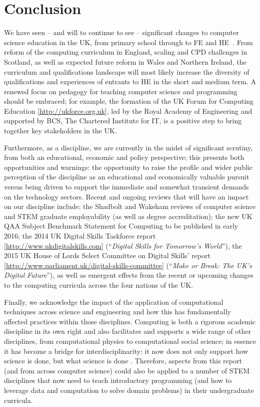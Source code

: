 \documentclass[conference,compsoc]{IEEEtran}
\begin{document}
\section{Conclusion}
 
We have seen -- and will to continue to see -- significant changes to
computer science education in the UK, from primary school through to
FE and HE~\cite{brown-et-al-toce2014}. From reform of the computing
curriculum in England, scaling and CPD challenges in Scotland, as well
as expected future reform in Wales and Northern Ireland, the
curriculum and qualifications landscape will most likely increase the
diversity of qualifications and experiences of entrants to HE in the
short and medium term. A renewed focus on pedagogy for teaching
computer science and programming should be embraced; for example, the
formation of the UK Forum for Computing Education
[\url{http://ukforce.org.uk}], led by the Royal Academy of Engineering
and supported by BCS, The Chartered Institute for IT, is a positive
step to bring together key stakeholders in the UK.
 
Furthermore, as a discipline, we are currently in the midst of
significant scrutiny, from both an educational, economic and policy
perspective; this presents both opportunities and warnings: the
opportunity to raise the profile and wider public perception of the
discipline as an educational and economically valuable pursuit versus
being driven to support the immediate and somewhat transient demands
on the technology sectors. Recent and ongoing reviews that will have
an impact on our discipline include: the Shadbolt and
Wakeham reviews of computer science and STEM graduate employability
(as well as degree accreditation); the new UK QAA Subject Benchmark
Statement for Computing to be published in early 2016; the 2014 UK
Digital Skills Taskforce report [\url{http://www.ukdigitalskills.com}]
(``{\emph{Digital Skills for Tomorrow's World}}''), the 2015 UK
House of Lords Select Committee on Digital Skills' report
[\url{http://www.parliament.uk/digital-skills-committee}]
(``{\emph{Make or Break: The UK's Digital Future}}''), as well as
emergent effects from the recent or upcoming changes to the computing
curricula across the four nations of the UK.
 
Finally, we acknowledge the impact of the application of computational
techniques across science and engineering and how this has
fundamentally affected practices within those disciplines. Computing
is both a rigorous academic discipline in its own right and also
facilitates and supports a wide range of other disciplines, from
computational physics to computational social science; in essence it
has become a bridge for interdisciplinarity: it now does not only
support how science is done, but what science is done
\cite{RS}. Therefore, aspects from this report (and from across
computer science) could also be applied to a number of STEM
disciplines that now need to teach introductory programming (and how
to leverage data and computation to solve domain problems) in their
undergraduate curricula.
\end{document}
